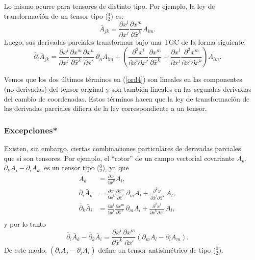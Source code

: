 Lo mismo ocurre para tensores de distinto tipo. Por ejemplo, la ley de transformación de un tensor tipo ($_2^0$) es:
\begin{equation}
\bar{A}_{jk}=\frac{\partial x^l}{\partial\bar{x}^j} \frac{\partial x^m}{\partial\bar{x}^k}A_{lm}. \label{ord3}
\end{equation}
Luego, sus derivadas parciales transforman bajo una TGC de la forma siguiente:
\begin{equation}
\bar{\partial}_i\bar{A}_{jk}=\frac{\partial x^l}{\partial\bar{x}^j} 
\frac{\partial x^m}{\partial\bar{x}^k} \frac{\partial x^n}{\partial \bar{x}^i}\,\partial_nA_{lm}+\left(
\frac{\partial^2 x^l}{\partial\bar{x}^i\partial\bar{x}^j} \frac{\partial x^m}{\partial\bar{x}^k} 
+\frac{\partial x^l}{\partial\bar{x}^j}\frac{\partial^2 x^m}{\partial\bar{x}^i\partial\bar{x}^k}\right) A_{lm}. \label{ord4}
\end{equation}

Vemos que los dos últimos términos en (\ref{ord4}) son lineales en las
componentes (no derivadas) del tensor original y son también lineales en las segundas derivadas del cambio de coordenadas. Estos términos hacen que la ley de transformación de las derivadas parciales difiera de la ley correspondiente a un tensor.

\subsubsection{Excepciones*}
Existen, sin embargo, ciertas combinaciones particulares de derivadas parciales que sí son tensores. Por ejemplo, el ``rotor'' de un campo vectorial covariante $A_k $, $\partial_k A_i-\partial_iA_k $, es un tensor tipo ($_2^0$), ya que
\begin{align}
\bar{A}_k  & =\frac{\partial x^l}{\partial\bar{x}^k} A_l ,\label{ord6}\\
\bar{\partial}_i\bar{A}_k  & =\frac{\partial x^l}{\partial\bar{x}^k} 
\frac{\partial x^m}{\partial\bar{x}^i}\, \partial_mA_l +
\frac{\partial^2 x^l}{\partial\bar{x}^i\partial\bar{x}^k}\, A_l ,\\
\bar{\partial}_k \bar{A}_i & =\frac{\partial x^l}{\partial\bar{x}^i}
\frac{\partial x^m}{\partial\bar{x}^k}\, \partial_mA_l +
\frac{\partial^2 x^l}{\partial\bar{x}^k\partial\bar{x}^i}\, A_l ,\\
\end{align}
y por lo tanto
\begin{equation}
 \bar{\partial}_i\bar{A}_k -\bar{\partial}_k \bar{A}_i =\frac{\partial x^l}{\partial\bar{x}^k} \frac{\partial x^m}{\partial\bar{x}^i} \left( \partial_m A_l -\partial_l A_m\right) .
\end{equation}
De este modo, $\left(\partial_iA_j -\partial_j A_i\right)$ define un tensor
antisimétrico de tipo ($_2^0$).

